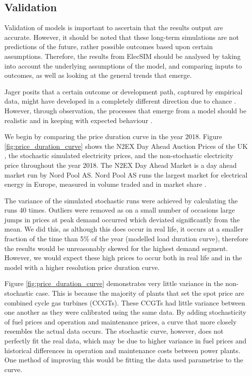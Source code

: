 
\subsection{Validation} Validation of models is important to ascertain that the results output are accurate. However, it should be noted that these long-term simulations are not predictions of the future, rather possible outcomes based upon certain assumptions. Therefore, the results from ElecSIM should be analysed by taking into account the underlying assumptions of the model, and comparing inputs to outcomes, as well as looking at the general trends that emerge.

Jager posits that a certain outcome or development path, captured by empirical data, might have developed in a completely different direction due to chance \cite{Jager2006a}. However, through observation, the processes that emerge from a model should be realistic and in keeping with expected behaviour \cite{Jager2006}.

We begin by comparing the price duration curve in the year 2018. Figure \ref{fig:price_duration_curve} shows the N2EX Day Ahead Auction Prices of the UK \cite{nordpool_2019}, the stochastic simulated electricity prices, and the non-stochastic electricity price throughout the year 2018. The N2EX Day Ahead Market is a day ahead market run by Nord Pool AS. Nord Pool AS runs the largest market for electrical energy in Europe, measured in volume traded and in market share \cite{nordpool_2019}.

The variance of the simulated stochastic runs were achieved by calculating the runs 40 times. Outliers were removed as on a small number of occasions large jumps in prices at peak demand occurred which deviated significantly from the mean. We did this, as although this does occur in real life, it occurs at a smaller fraction of the time than 5\% of the year (modelled load duration curve), therefore the results would be unreasonably skewed for the highest demand segment. However, we would expect these high prices to occur both in real life and in the model with a higher resolution price duration curve.

Figure \ref{fig:price_duration_curve} demonstrates very little variance in the non-stochastic case. This is because the majority of plants that set the spot price are combined cycle gas turbines (CCGTs). These CCGTs had little variance between one another as they were calibrated using the same data. By adding stochasticity of fuel prices and operation and maintenance prices, a curve that more closely resembles the actual data occurs. The stochastic curve, however, does not perfectly fit the real data, which may be due to higher variance in fuel prices and historical differences in operation and maintenance costs between power plants. One method of improving this would be fitting the data used parametrise to the curve.

